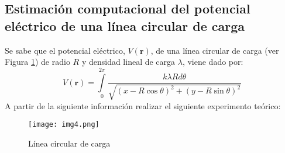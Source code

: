 





\begin{multicols}{2}

\section*{Estimación computacional del potencial eléctrico de una línea circular de carga}

Se sabe que el potencial eléctrico, $V(\mathbf{r})$, de una línea circular de carga (ver Figura \ref{figenu:1}) de radio $R$ y densidad lineal de carga $\lambda$, viene dado por:
\begin{equation}
    V(\mathbf{r}) = \int\limits_{0}^{2\pi} \frac{k \lambda R d \theta}{\sqrt{\left(x-R\cos\theta\right)^{2}+\left(y-R\sin\theta\right)^{2}}} \label{ecuenu:1}
\end{equation}
A partir de la siguiente información realizar el siguiente experimento teórico:

\begin{figure}[H]
\begin{center}
\texttt{[image: img4.png]}
\caption{Línea circular de carga}
\label{figenu:1}
\end{center}
\end{figure}


\end{multicols}
